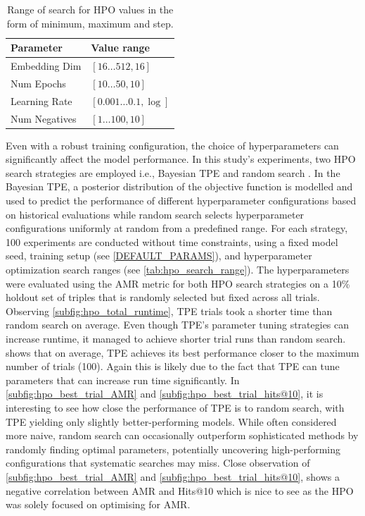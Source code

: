 \begin{table}[b]
    \centering
    \begin{tabular}{ll}
    \hline \hline \textbf{Parameter} & \textbf{Value range} \bigstrut \\
    \hline Embedding Dim & {$[16 \ldots 512,16]$} \bigstrut \\
    Num Epochs & {$[10 \ldots 50,10]$} \bigstrut \\
    Learning Rate & {$[0.001 \ldots 0.1, \log ]$} \bigstrut \\
    Num Negatives & {$[1 \ldots 100,10]$} \bigstrut \\
    \hline
    \end{tabular}
    \caption{Range of search for \ac{HPO} values in the form of minimum, maximum and step.}
    \label{tab:hpo_search_range}
\end{table}

\noindent Even with a robust training configuration, the choice of hyperparameters can significantly affect the model performance. In this study's experiments, two \ac{HPO} search strategies are employed i.e., Bayesian \ac{TPE} \citep{Bergstra2011AlgorithmsOptimization} and random search \citep{Bergstra2012RandomOptimization}. In the Bayesian \ac{TPE}, a posterior distribution of the objective function is modelled and used to predict the performance of different hyperparameter configurations based on historical evaluations while random search selects hyperparameter configurations uniformly at random from a predefined range. For each strategy, 100 experiments are conducted without time constraints, using a fixed model seed, training setup (see \autoref{DEFAULT_PARAMS}), and hyperparameter optimization search ranges (see \autoref{tab:hpo_search_range}). The hyperparameters were evaluated using the AMR metric for both \ac{HPO} search strategies on a 10\% holdout set of triples that is randomly selected but fixed across all trials. Observing \autoref{subfig:hpo_total_runtime}, \ac{TPE} trials took a shorter time than random search on average. Even though \ac{TPE}'s parameter tuning strategies can increase runtime, it managed to achieve shorter trial runs than random search.  shows that on average, \ac{TPE} achieves its best performance closer to the maximum number of trials (100). Again this is likely due to the fact that \ac{TPE} can tune parameters that can increase run time significantly. In \autoref{subfig:hpo_best_trial_AMR} and \autoref{subfig:hpo_best_trial_hits@10}, it is interesting to see how close the performance of \ac{TPE} is to random search, with \ac{TPE} yielding only slightly better-performing models. While often considered more naive, random search can occasionally outperform sophisticated methods by randomly finding optimal parameters, potentially uncovering high-performing configurations that systematic searches may miss. Close observation of \autoref{subfig:hpo_best_trial_AMR} and \autoref{subfig:hpo_best_trial_hits@10}, shows a negative correlation between \ac{AMR} and Hits@10 which is nice to see as the \ac{HPO} was solely focused on optimising for \ac{AMR}.

